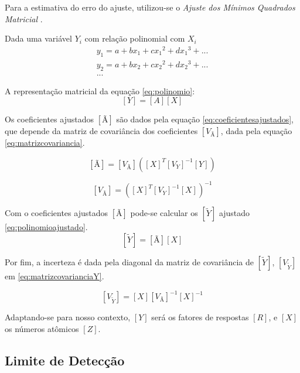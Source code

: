 Para a estimativa do erro do ajuste, utilizou-se o 
\textit{Ajuste dos Mínimos Quadrados Matricial} \citep{helene2006}.

Dada uma variável $Y_i$ com relação polinomial com $X_i$ 
\begin{equation}
  \label{eq:polinomio}
  \begin{split}
    y_1 = a + b x_1 + c{x_1}^2 + d{x_1}^3 + ...\\
    y_2 = a + b x_2 + c{x_2}^2 + d{x_2}^3 + ... \\
    ...
  \end{split}
\end{equation}

A representação matricial da equação \ref{eq:polinomio}:
\begin{equation}
  \label{eq:polinomioMatriz}
  [Y] = [A][X]
\end{equation}

Os coeficientes ajustados $[Ã]$ são dados pela equação \ref{eq:coeficientesajustados},
que depende da matriz de covariância dos coeficientes $[V_{Ã}]$, 
dada pela equação \ref{eq:matrizcovariancia}.

\begin{equation}
  \label{eq:coeficientesajustados}
  [Ã] = [V_{Ã}] ([X]^T {[V_Y]}^{-1} [Y])
\end{equation}

\begin{equation}
  \label{eq:matrizcovariancia}
  [V_{Ã}] = ([X]^T [V_Y]^{-1} [X])^{-1}
\end{equation}

Com o coeficientes ajustados $[Ã]$ pode-se calcular os $[\tilde{Y}]$ ajustado \ref{eq:polinomioajustado}.
\begin{equation}
  \label{eq:polinomioajustado}
  [\tilde{Y}] = [Ã][X]
\end{equation}

Por fim, a incerteza é dada pela diagonal da matriz de covariância de $[\tilde{Y}]$, 
$[V_{\tilde{Y}}]$ em \ref{eq:matrizcovarianciaY}.

\begin{equation}
  \label{eq:matrizcovarianciaY}
  [V_{\tilde{Y}}] = [X] [V_{Ã}]^{-1} [X]^{-1}
\end{equation}

Adaptando-se para nosso contexto, $[Y]$ será os fatores de respostas $[R]$,
e $[X]$ os números atômicos $[Z]$.

\subsection{Limite de Detecção}

